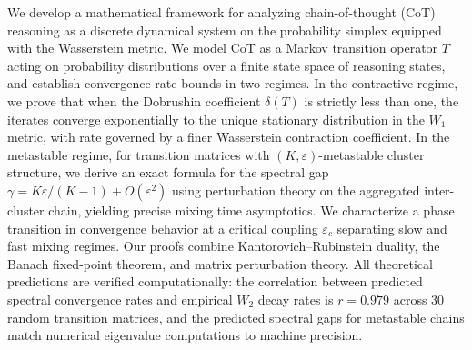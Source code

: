 We develop a mathematical framework for analyzing chain-of-thought (CoT) reasoning
as a discrete dynamical system on the probability simplex equipped with the
Wasserstein metric. We model CoT as a Markov transition operator $T$ acting on
probability distributions over a finite state space of reasoning states, and
establish convergence rate bounds in two regimes. In the contractive regime, we
prove that when the Dobrushin coefficient $\delta(T)$ is strictly less than one,
the iterates converge exponentially to the unique stationary distribution in the
$W_1$ metric, with rate governed by a finer Wasserstein contraction coefficient.
In the metastable regime, for transition matrices with $(K,\varepsilon)$-metastable
cluster structure, we derive an exact formula for the spectral gap
$\gamma = K\varepsilon/(K-1) + O(\varepsilon^2)$ using perturbation theory on
the aggregated inter-cluster chain, yielding precise mixing time asymptotics.
We characterize a phase transition in convergence behavior at a critical coupling
$\varepsilon_c$ separating slow and fast mixing regimes. Our proofs combine
Kantorovich--Rubinstein duality, the Banach fixed-point theorem, and matrix
perturbation theory. All theoretical predictions are verified computationally:
the correlation between predicted spectral convergence rates and empirical $W_2$
decay rates is $r = 0.979$ across 30 random transition matrices, and the
predicted spectral gaps for metastable chains match numerical eigenvalue
computations to machine precision.
